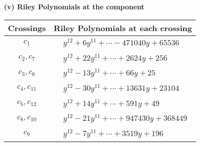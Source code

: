 \documentclass[1p]{elsarticle_modified}
\theoremstyle{definition}
\begin{document}
\flushleft \textbf{(v) Riley Polynomials at the component}\newline \\
\begin{tabular}{m{50pt}|m{274pt}}
Crossings & \hspace{64pt}Riley Polynomials at each crossing \\
\hline $$\begin{aligned}c_{1}\end{aligned}$$&$\begin{aligned}
&y^{12}+6 y^{11}+\cdots-471040 y+65536
\end{aligned}$\\
\hline $$\begin{aligned}c_{2},c_{7}\end{aligned}$$&$\begin{aligned}
&y^{12}+22 y^{11}+\cdots+2624 y+256
\end{aligned}$\\
\hline $$\begin{aligned}c_{3},c_{6}\end{aligned}$$&$\begin{aligned}
&y^{12}-13 y^{11}+\cdots+66 y+25
\end{aligned}$\\
\hline $$\begin{aligned}c_{4},c_{11}\end{aligned}$$&$\begin{aligned}
&y^{12}-30 y^{11}+\cdots+13631 y+23104
\end{aligned}$\\
\hline $$\begin{aligned}c_{5},c_{12}\end{aligned}$$&$\begin{aligned}
&y^{12}+14 y^{11}+\cdots+591 y+49
\end{aligned}$\\
\hline $$\begin{aligned}c_{8},c_{10}\end{aligned}$$&$\begin{aligned}
&y^{12}-21 y^{11}+\cdots+947430 y+368449
\end{aligned}$\\
\hline $$\begin{aligned}c_{9}\end{aligned}$$&$\begin{aligned}
&y^{12}-7 y^{11}+\cdots+3519 y+196
\end{aligned}$\\
\hline
\end{tabular}\\~\\
\end{document}
